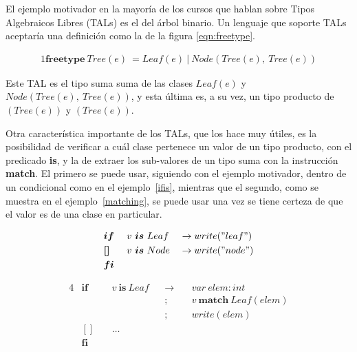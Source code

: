 El ejemplo motivador en la mayoría de los cursos que hablan sobre Tipos
Algebraicos Libres (TALs) es el del árbol binario. Un lenguaje que soporte TALs
aceptaría una definición como la de la figura \ref{eqn:freetype}.

\begin{alignat}{1}
\textbf{freetype}\ Tree(e)\ = Leaf(e)\ |\ Node(Tree(e),\ Tree(e)) \label{eqn:freetype}
\end{alignat}


Este TAL es el tipo suma suma de las clases
$Leaf(e)$ y $Node(Tree(e),\ Tree(e))$,
y esta última es, a su vez, un tipo producto de $(Tree(e))$ y $(Tree(e))$.

Otra característica importante de los TALs, que los hace muy útiles, es la
posibilidad de verificar a cuál clase pertenece un valor de un tipo producto,
con el predicado \textbf{is}, y la de extraer los sub-valores de un tipo suma
con la instrucción \textbf{match}. El primero se puede usar, siguiendo con el
ejemplo motivador, dentro de un condicional como en el ejemplo~\ref{ifis},
mientras que el segundo, como se muestra en el ejemplo~\ref{matching}, se puede
usar una vez se tiene certeza de que el valor es de una clase en particular.

\begin{alignat}{3}
&\boldsymbol{if}\ && v\ \boldsymbol{is}\ Leaf && \rightarrow write("leaf") \nonumber \\
&\boldsymbol{[]}\ && v\ \boldsymbol{is}\ Node && \rightarrow write("node") \label{ifis} \\
&\boldsymbol{fi} \nonumber
\end{alignat}

\begin{alignat}{4}
&\boldsymbol{if}\ && v\ \boldsymbol{is}\ Leaf && \rightarrow &&\ var\ elem : int                   \nonumber \\
&                 &&                          &&           ; &&\ v\ \boldsymbol{match}\ Leaf(elem) \nonumber \\
&                 &&                          &&           ; &&\ write (elem)                      \label{matching} \\
&\boldsymbol{[]}\ && \ldots                                                                        \nonumber \\
&\boldsymbol{fi}                                                                                   \nonumber
\end{alignat}

